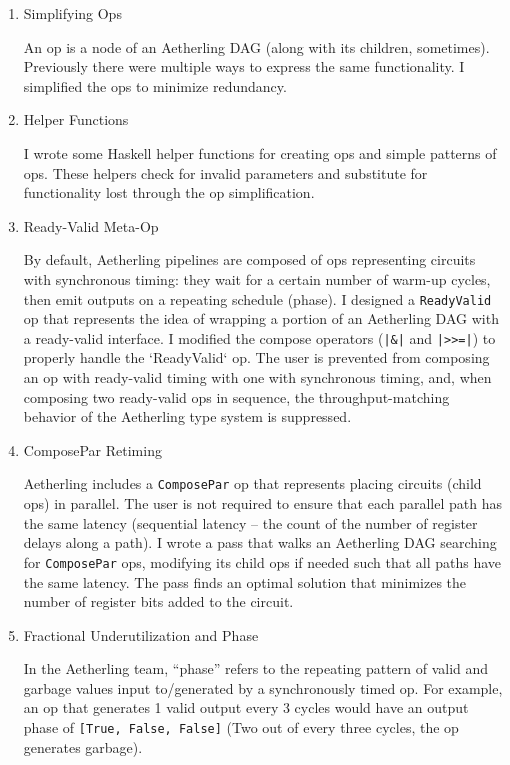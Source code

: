 \documentclass[12pt]{article}
\begin{document}
\begin{enumerate}
\item Simplifying Ops

An op is a node of an Aetherling DAG (along with its children,
sometimes). Previously there were multiple ways to express the same
functionality. I simplified the ops to minimize redundancy.

\item Helper Functions

I wrote some Haskell helper functions for creating ops and simple
patterns of ops. These helpers check for invalid parameters and
substitute for functionality lost through the op simplification.

\item Ready-Valid Meta-Op

By default, Aetherling pipelines are composed of ops representing
circuits with synchronous timing: they wait for a certain number of
warm-up cycles, then emit outputs on a repeating schedule (phase). I
designed a \texttt{ReadyValid} op that represents the idea of wrapping
a portion of an Aetherling DAG with a ready-valid interface.  I
modified the compose operators (\texttt{|\&|} and \texttt{|>>=|}) to
properly handle the `ReadyValid` op.  The user is prevented from
composing an op with ready-valid timing with one with synchronous
timing, and, when composing two ready-valid ops in sequence, the
throughput-matching behavior of the Aetherling type system is
suppressed.

\item ComposePar Retiming

Aetherling includes a \texttt{ComposePar} op that represents placing
circuits (child ops) in parallel. The user is not required to ensure
that each parallel path has the same latency (sequential latency --
the count of the number of register delays along a path). I wrote a
pass that walks an Aetherling DAG searching for \texttt{ComposePar}
ops, modifying its child ops if needed such that all paths have the
same latency. The pass finds an optimal solution that minimizes the
number of register bits added to the circuit.

\item Fractional Underutilization and Phase

In the Aetherling team, ``phase'' refers to the repeating pattern of
valid and garbage values input to/generated by a synchronously timed
op. For example, an op that generates 1 valid output every 3 cycles
would have an output phase of \texttt{[True, False, False]} (Two out
of every three cycles, the op generates garbage).


\end{enumerate}
\end{document}
